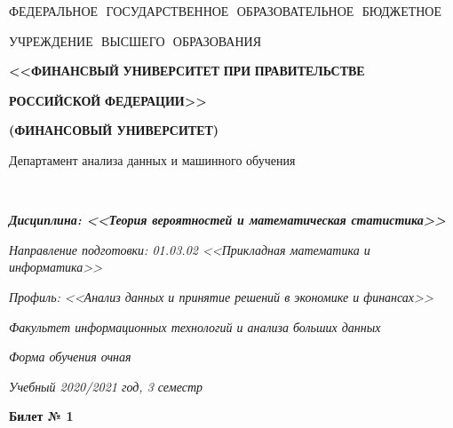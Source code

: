 \documentclass[11pt]{article}
\providecommand{\biletnumber}{1}
\begin{document}
\centerline{\footnotesize{ФЕДЕРАЛЬНОЕ\,\, ГОСУДАРСТВЕННОЕ\,\, ОБРАЗОВАТЕЛЬНОЕ\,\, БЮДЖЕТНОЕ}}
\centerline{\footnotesize{УЧРЕЖДЕНИЕ\,\, ВЫСШЕГО\,\, ОБРАЗОВАНИЯ}}

\centerline{\small{\textbf{<<ФИНАНСВЫЙ\,\,УНИВЕРСИТЕТ\,\,ПРИ\,\,ПРАВИТЕЛЬСТВЕ}}}
\centerline{\small{\textbf{РОССИЙСКОЙ\,\,ФЕДЕРАЦИИ>>}}}
\centerline{\small{\textbf{(ФИНАНСОВЫЙ УНИВЕРСИТЕТ)}}}

\hfill \break
\centerline{\normalsize{Департамент анализа данных и машинного обучения}}\\

\centerline{\normalsize{{\textit{\textbf{Дисциплина: <<Теория вероятностей и математическая статистика>>}}}}}
\centerline{\small{\textit{Направление подготовки: 01.03.02 <<Прикладная математика и информатика>>}}}
\centerline{\small{\textit{Профиль: <<Анализ данных и принятие решений в экономике и финансах>>}}}
\centerline{\small{\textit{Факультет информационных технологий и анализа больших данных}}}
\centerline{\small{\textit{Форма обучения очная}}}
\centerline{\small{\textit{Учебный 2020/2021 год, 3 семестр}}}

\hfill \break
\centerline{\textbf{Билет № \biletnumber}}

\end{document}
